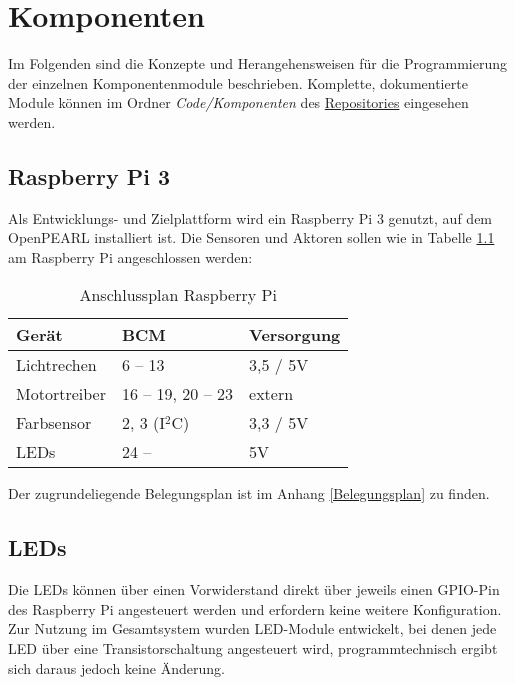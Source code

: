 \chapter{Komponenten}
\label{komponenten}

Im Folgenden sind die Konzepte und Herangehensweisen für die Programmierung der einzelnen Komponentenmodule beschrieben. Komplette, dokumentierte Module können im Ordner \emph{Code/Komponenten} des \href{https://github.com/OpenPearl-HFUWPV1718/SensorCar}{Repositories} eingesehen werden.

\section{Raspberry Pi 3}
Als Entwicklungs- und Zielplattform wird ein Raspberry Pi 3 genutzt, auf dem OpenPEARL installiert ist. Die Sensoren und Aktoren sollen wie in Tabelle \ref{tab:anschlussplan} am Raspberry Pi angeschlossen werden:

\begin{table} [H]
	\begin{center}
		 \renewcommand{\arraystretch}{1.5}
		\begin{tabular}{|l|l|l|}
			\hline
			\textbf{Gerät} & \textbf{BCM} & \textbf{Versorgung}\\
			\hline
			Lichtrechen & 6 -- 13 & 3,5 / 5V\\
			\hline
			Motortreiber& 16 -- 19, 20 -- 23 & extern\\
			\hline
			Farbsensor & 2, 3 (I$^2$C) & 3,3 / 5V\\
			\hline
			LEDs & 24 -- & 5V\\
			\hline
		\end{tabular}
	\end{center}
\caption{Anschlussplan Raspberry Pi}\label{tab:anschlussplan}
\end{table}

Der zugrundeliegende Belegungsplan ist im Anhang \ref{Belegungsplan} zu finden.

\section{LEDs}
Die LEDs können über einen Vorwiderstand direkt über jeweils einen GPIO-Pin des Raspberry Pi angesteuert werden und erfordern keine weitere Konfiguration. Zur Nutzung im Gesamtsystem wurden LED-Module entwickelt, bei denen jede LED über eine Transistorschaltung angesteuert wird, programmtechnisch ergibt sich daraus jedoch keine Änderung.

